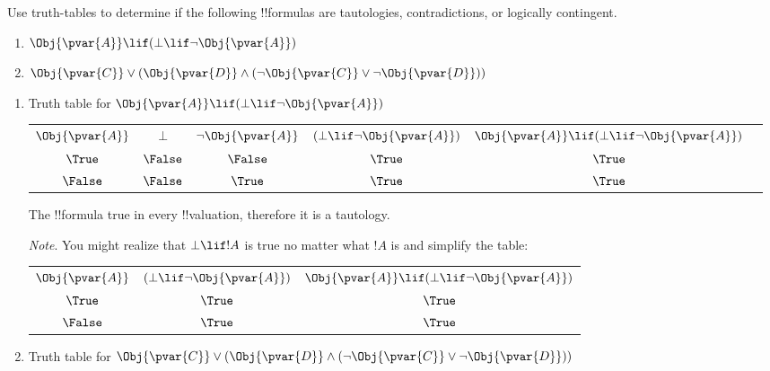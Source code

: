 \documentclass[../../../include/open-logic-section]{subfiles}
\begin{document}
\begin{prob}
    \citep[1.1 item 3]{MacFarlane-2020-PhilosophicalLogicContemporary}
    Use truth-tables to determine if the following !!{formula}s are 
    tautologies, contradictions, or logically contingent.
    \begin{enumerate}
    \item $\Obj{\pvar{A}}\lif(\bot\lif\lnot\Obj{\pvar{A}})$
    \item $\Obj{\pvar{C}}\lor(\Obj{\pvar{D}}\land(\lnot \Obj{\pvar{C}}\lor \lnot \Obj{\pvar{D}}))$
    \end{enumerate}

    \begin{ans}
    \begin{enumerate}
    \item Truth table for $\Obj{\pvar{A}}\lif(\bot\lif\lnot\Obj{\pvar{A}})$
    
    \begin{tabular}{c||c|c|c|c|c}
        $\Obj{\pvar{A}}$ & $\bot$ & $\lnot\Obj{\pvar{A}}$ & $(\bot\lif\lnot\Obj{\pvar{A}})$ &  $\Obj{\pvar{A}}\lif(\bot\lif\lnot\Obj{\pvar{A}})$  \\
        $\True$ & $\False$ & $\False$ & $\True$  & $\True$ \\
        $\False$ & $\False$ & $\True$  & $\True$ & $\True$ \\
    \end{tabular}

    The !!{formula} true in every !!{valuation}, therefore it is a tautology.

    \emph{Note}. You might realize that $\bot\lif!A$ is true no matter what $!A$ is 
    and simplify the table:

    \begin{tabular}{c||c|c}
        $\Obj{\pvar{A}}$ & $(\bot\lif\lnot\Obj{\pvar{A}})$ &  $\Obj{\pvar{A}}\lif(\bot\lif\lnot\Obj{\pvar{A}})$  \\
        $\True$ & $\True$  & $\True$ \\
        $\False$  & $\True$ & $\True$ \\
    \end{tabular}

    \item Truth table for $\Obj{\pvar{C}}\lor(\Obj{\pvar{D}}\land(\lnot \Obj{\pvar{C}}\lor \lnot \Obj{\pvar{D}}))$


\end{enumerate}
\end{ans}
\end{prob}
\end{document}
